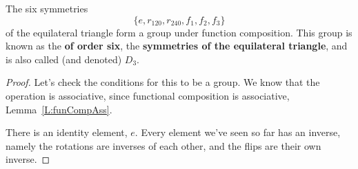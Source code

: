 \documentclass{ximera}
\begin{document}
\begin{example}
  The six symmetries
  \[
  \{e,r_{120},r_{240},f_1,f_2,f_3\}
  \]
  of the equilateral triangle form a group under function
  composition. This group is known as the \textbf{
    of order six}, the \textbf{symmetries of the equilateral triangle},
  and is also called (and denoted) $D_3$.
  \begin{proof}
    Let's check the conditions for this to be a group. We know that
    the operation is associative, since functional composition is
    associative, Lemma~\ref{L:funCompAss}.

    There is an identity element, $e$. Every element we've seen so far
    has an inverse, namely the rotations are inverses of each other,
    and the flips are their own inverse.
    

\end{proof}
\end{example}
\end{document}

